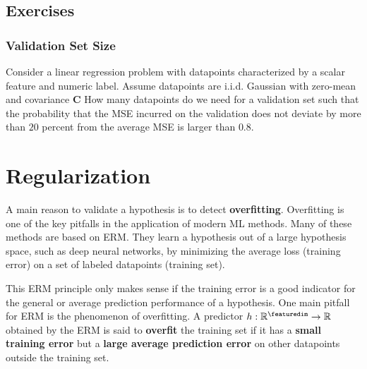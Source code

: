 \documentclass[12pt]{report}
\begin{document}
\section{Exercises} 
\subsection{Validation Set Size} 
Consider a linear regression problem with datapoints characterized 
by a scalar feature and numeric label. Assume datapoints are i.i.d. 
Gaussian with zero-mean and covariance $\mathbf{C}$ How many datapoints 
do we need for a validation set such that the probability that the MSE incurred on the validation 
does not deviate by more than $20$ percent from the average MSE is larger than $0.8$. 



\newpage 
\chapter{Regularization}
\label{ch_overfitting_regularization}


A main reason to validate a hypothesis is to detect {\bf overfitting}.
Overfitting is one of the key pitfalls in the application of modern 
ML methods. Many of these methods are based on ERM. They learn 
a hypothesis out of a large hypothesis space, such as deep neural 
networks, by minimizing the average loss (training error) on a set 
of labeled datapoints (training set). 

This ERM principle only makes sense if the training error  
is a good indicator for the general or average prediction performance of a hypothesis. %
One main pitfall for ERM is the phenomenon of overfitting. 
A predictor $h: \mathbb{R}^{\featuredim} \rightarrow \mathbb{R}$ 
obtained by the ERM is said to {\bf overfit} the training set if it 
has a {\bf small training error} but a {\bf large average prediction error} 
on other datapoints outside the training set. 
\end{document}
